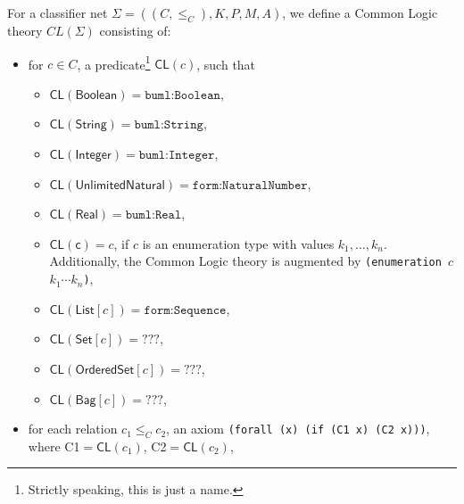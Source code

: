 \documentclass[10pt,fleqn,%
\ifpretendfinal
final%
\else
draft%
\fi,
]{scrreprt}
\newcommand*{\CL}{\ensuremath{\mathsf{CL}}\xspace}
\begin{document}
For a classifier net
$\Sigma = ((C, {\leq_C}), K, P, M, A)$, we define a Common Logic theory
$CL(\Sigma)$ consisting of:
%
\begin{itemize} %
\item for $c \in C$, a predicate\footnote{Strictly speaking, this is just a name.} $\CL(c)$,  such that 
\begin{itemize} %
\item 
  $\CL(\mathsf{Boolean}) = \texttt{buml:Boolean}$, 
\item 
  $\CL(\mathsf{String}) = \texttt{buml:String}$,
\item 
  $\CL(\mathsf{Integer}) = \texttt{buml:Integer}$,
\item 
  $\CL(\mathsf{UnlimitedNatural}) = \texttt{form:NaturalNumber}$,
\item 
  $\CL(\mathsf{Real}) = \texttt{buml:Real}$,
\item 
  $\CL(\mathsf{c}) = c$, if $c$ is an enumeration type with values $k_1,\ldots,k_n$. Additionally, the Common Logic theory is augmented by
\texttt{(enumeration $c$ $k_1 \cdots k_n$)},
\item 
  $\CL(\mathsf{List}[c]) = \texttt{form:Sequence}$,
\item 
  $\CL(\mathsf{Set}[c]) = ???$,
\item 
  $\CL(\mathsf{OrderedSet}[c]) = ???$,
\item 
  $\CL(\mathsf{Bag}[c]) = ???$,
 
\end{itemize}
\item for each relation $c_1
  \leq_C c_2$, an axiom \texttt{(forall (x) (if (C1 x) (C2 x)))},
  where C1$=\CL(c_1)$, C2$=\CL(c_2)$, 


\end{itemize}
\end{document}
